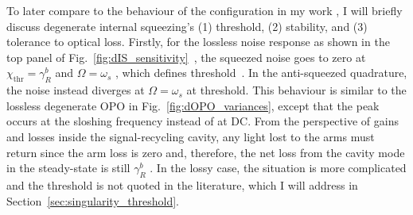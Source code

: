 To later compare to the behaviour of the configuration in my work , I will briefly discuss degenerate internal squeezing's (1) threshold, (2) stability, and (3) tolerance to optical loss.
Firstly, for the lossless noise response as shown in the top panel of Fig.~\ref{fig:dIS_sensitivity}~\cite{korobkoQuantumExpanderGravitationalwave2019}, 
the squeezed noise goes to zero at $\chi_\text{thr}=\gamma^b_R$ and $\Omega=\omega_s$ , which defines threshold~\cite{}. In the anti-squeezed quadrature, the noise instead diverges at $\Omega=\omega_s$ at threshold. This behaviour is similar to the lossless degenerate OPO in Fig.~\ref{fig:dOPO_variances}, except that the peak occurs at the sloshing frequency instead of at DC. From the perspective of gains and losses inside the signal-recycling cavity, any light lost to the arms must return since the arm loss is zero and, therefore, the net loss from the cavity mode in the steady-state is still $\gamma^b_R$ . In the lossy case, the situation is more complicated and the threshold is not quoted in the literature, which I will address in Section~\ref{sec:singularity_threshold}. 



